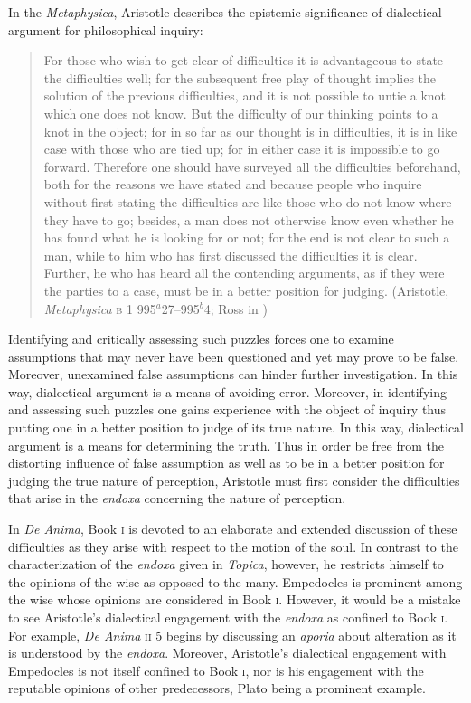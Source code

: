 In the \emph{Metaphysica}, Aristotle describes the epistemic significance of dialectical argument for philosophical inquiry:
\begin{quote}
	For those who wish to get clear of difficulties it is advantageous to state the difficulties well; for the subsequent free play of thought implies the solution of the previous difficulties, and it is not possible to untie a knot which one does not know. But the difficulty of our thinking points to a knot in the object; for in so far as our thought is in difficulties, it is in like case with those who are tied up; for in either case it is impossible to go forward. Therefore one should have surveyed all the difficulties beforehand, both for the reasons we have stated and because people who inquire without first stating the difficulties are like those who do not know where they have to go; besides, a man does not otherwise know even whether he has found what he is looking for or not; for the end is not clear to such a man, while to him who has first discussed the difficulties it is clear. Further, he who has heard all the contending arguments, as if they were the parties to a case, must be in a better position for judging. (Aristotle, \emph{Metaphysica} \textsc{b} 1 995\( ^{a} \)27--995\( ^{b} \)4; Ross in \citealt[28]{Barnes:1984kx})
\end{quote}
Identifying and critically assessing such puzzles forces one to examine assumptions that may never have been questioned and yet may prove to be false. Moreover, unexamined false assumptions can hinder further investigation. In this way, dialectical argument is a means of avoiding error. Moreover, in identifying and assessing such puzzles one gains experience with the object of inquiry thus putting one in a better position to judge of its true nature. In this way, dialectical argument is a means for determining the truth. Thus in order be free from the distorting influence of false assumption as well as to be in a better position for judging the true nature of perception, Aristotle must first consider the difficulties that arise in the \emph{endoxa} concerning the nature of perception. 

In \emph{De Anima}, Book \textsc{i} is devoted to an elaborate and extended discussion of these difficulties as they arise with respect to the motion of the soul. In contrast to the characterization of the \emph{endoxa} given in \emph{Topica}, however, he restricts himself to the opinions of the wise as opposed to the many. Empedocles is prominent among the wise whose opinions are considered in Book \textsc{i}. However, it would be a mistake to see Aristotle's dialectical engagement with the \emph{endoxa} as confined to Book \textsc{i}. For example, \emph{De Anima} \textsc{ii} 5 begins by discussing an \emph{aporia} about alteration as it is understood by the \emph{endoxa}. Moreover, Aristotle's dialectical engagement with Empedocles is not itself confined to Book \textsc{i}, nor is his engagement with the reputable opinions of other predecessors, Plato being a prominent example. 

